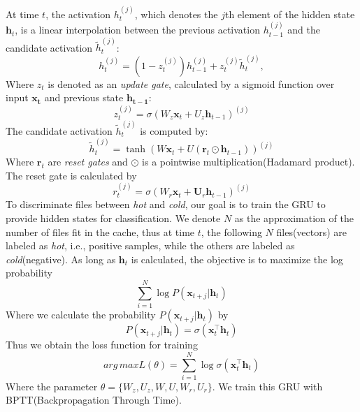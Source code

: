 \documentclass[conference]{IEEEtran}
\begin{document}
At time $t$, the activation $h_t^{(j)}$, which denotes the $j$th element of the hidden state $\mathbf{h}_t$, is a linear interpolation between the previous activation $h_{t-1}^{(j)}$ and the candidate activation $\tilde{h}_t^{(j)}$:
\begin{equation}
    h_t^{(j)} = (1-z_t^{(j)}) h_{t-1}^{(j)} + z_t^{(j)}\tilde{h}_t^{(j)},
\end{equation}
Where $z_t$ is denoted as an \textit{update gate}, calculated by a sigmoid function over input $\mathbf{x_t}$ and previous state $\mathbf{h_{t-1}}$:
\begin{equation}
z_t^{(j)} = \sigma(W_z \mathbf{x}_t + U_z \mathbf{h}_{t-1})^{(j)}
\end{equation}
The candidate activation $\tilde{h}_t^{(j)}$ is computed by:
\begin{equation}
    \tilde{h}_t^{(j)} = \tanh(W \mathbf{x}_t + U (\mathbf{r}_t \odot \mathbf{h}_{t-1}))^{(j)}
\end{equation}
Where $\mathbf{r}_t$ are \textit{reset gates} and $\odot$ is a pointwise multiplication(Hadamard product).
The reset gate is calculated by
\begin{equation}
    r_t^{(j)} = \sigma(W_r \mathbf{x}_t + \mathbf{U}_r \mathbf{h}_{t-1})^{(j)}
\end{equation}
To discriminate files between \textit{hot} and \textit{cold}, 
our goal is to train the GRU to provide hidden states for classification. 
We denote $N$ as the approximation of the number of files fit in the cache,
thus at time $t$, the following $N$ files(vectors) are labeled as \textit{hot}, i.e., positive samples, 
while the others are labeled as \textit{cold}(negative).
As long as $\mathbf{h}_t$ is calculated, the objective is to maximize the log probability
\begin{equation}
    \label{eq.obj}
    \sum_{i=1}^N \log P(\mathbf{x}_{t+j}|\mathbf{h}_t)
\end{equation}
Where we calculate the probability $P(\mathbf{x}_{t+j}|\mathbf{h}_t)$ by
\begin{equation}
    P(\mathbf{x}_{t+j}|\mathbf{h}_t) = \sigma(\mathbf{x}^\top_t \mathbf{h}_t)
\end{equation}
Thus we obtain the loss function for training
\begin{equation}
    arg\,max L(\theta) = \sum_{i=1}^N \log \sigma(\mathbf{x}^\top_t \mathbf{h}_t)
\end{equation}
Where the parameter $\theta = \{W_z, U_z, W, U, W_r, U_r\}$.
We train this GRU with BPTT(Backpropagation Through Time).
\end{document}
